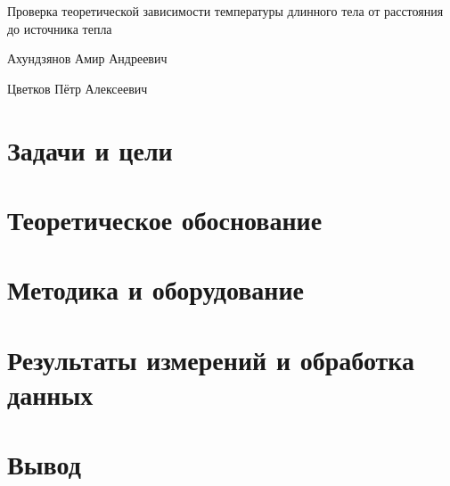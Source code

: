 \documentclass[12pt,a4paper]{scrartcl}
\begin{document}
\begin{center}
\begin{large}
Проверка теоретической зависимости температуры длинного тела от расстояния до источника тепла
\end{large}
	\bigskip
     
Ахундзянов Амир Андреевич

Цветков Пётр Алексеевич
\end{center}

\section{Задачи и цели}

\section{Теоретическое обоснование}

\section{Методика и оборудование}

\section{Результаты измерений и обработка данных}

\section{Вывод}
\end{document}
